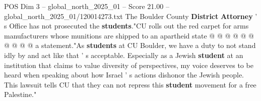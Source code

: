 \begin{textsample}{POS Dim 3 – global\_north\_2025\_01 – Score 21.00 – global\_north\_2025\_01/120014273.txt}
The Boulder County \textbf{District} \textbf{Attorney} ' s Office has not prosecuted the \textbf{students}."CU rolls out the red carpet for arms manufacturers whose munitions are shipped to an apartheid state @ @ @ @ @ @ @ @ @ @ a statement."As \textbf{students} at CU Boulder, we have a duty to not stand idly by and act like that ' s acceptable.
Especially as a Jewish \textbf{student} at an institution that claims to value diversity of perspectives, my voice deserves to be heard when speaking about how Israel ' s actions dishonor the Jewish people.
This lawsuit tells CU that they can not repress this \textbf{student} movement for a free Palestine."

\end{textsample}
